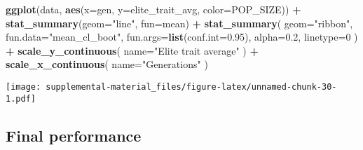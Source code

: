 \documentclass[]{book}
\newenvironment{Shaded}{\begin{snugshade}}{\end{snugshade}}
\newcommand{\DataTypeTok}[1]{\textcolor[rgb]{0.13,0.29,0.53}{#1}}
\newcommand{\DecValTok}[1]{\textcolor[rgb]{0.00,0.00,0.81}{#1}}
\newcommand{\FloatTok}[1]{\textcolor[rgb]{0.00,0.00,0.81}{#1}}
\newcommand{\KeywordTok}[1]{\textcolor[rgb]{0.13,0.29,0.53}{\textbf{#1}}}
\newcommand{\NormalTok}[1]{#1}
\newcommand{\OperatorTok}[1]{\textcolor[rgb]{0.81,0.36,0.00}{\textbf{#1}}}
\newcommand{\StringTok}[1]{\textcolor[rgb]{0.31,0.60,0.02}{#1}}
\begin{document}
\begin{Shaded}
\begin{Highlighting}[]
\KeywordTok{ggplot}\NormalTok{(data, }\KeywordTok{aes}\NormalTok{(}\DataTypeTok{x=}\NormalTok{gen, }\DataTypeTok{y=}\NormalTok{elite_trait_avg, }\DataTypeTok{color=}\NormalTok{POP_SIZE)) }\OperatorTok{+}
\StringTok{  }\KeywordTok{stat_summary}\NormalTok{(}\DataTypeTok{geom=}\StringTok{"line"}\NormalTok{, }\DataTypeTok{fun=}\NormalTok{mean) }\OperatorTok{+}
\StringTok{  }\KeywordTok{stat_summary}\NormalTok{(}
    \DataTypeTok{geom=}\StringTok{"ribbon"}\NormalTok{,}
    \DataTypeTok{fun.data=}\StringTok{"mean_cl_boot"}\NormalTok{,}
    \DataTypeTok{fun.args=}\KeywordTok{list}\NormalTok{(}\DataTypeTok{conf.int=}\FloatTok{0.95}\NormalTok{),}
    \DataTypeTok{alpha=}\FloatTok{0.2}\NormalTok{,}
    \DataTypeTok{linetype=}\DecValTok{0}
\NormalTok{  ) }\OperatorTok{+}
\StringTok{  }\KeywordTok{scale_y_continuous}\NormalTok{(}
    \DataTypeTok{name=}\StringTok{"Elite trait average"}
\NormalTok{  ) }\OperatorTok{+}
\StringTok{  }\KeywordTok{scale_x_continuous}\NormalTok{(}
    \DataTypeTok{name=}\StringTok{"Generations"}
\NormalTok{  )}
\end{Highlighting}
\end{Shaded}

\texttt{[image: supplemental-material\_files/figure-latex/unnamed-chunk-30-1.pdf]}

\hypertarget{final-performance-2}{%
\subsection{Final performance}\label{final-performance-2}}
\end{document}
